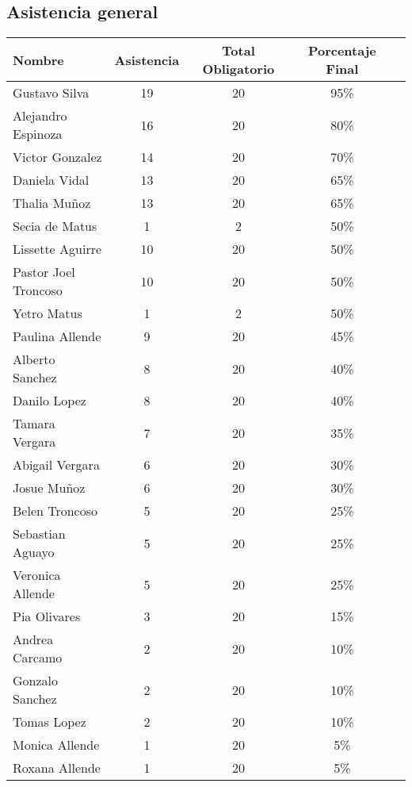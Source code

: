 \documentclass[12pt,letterpaper]{article}
\begin{document}
\subsection{Asistencia general}
\begin{table}[!h]
\centering
\begin{tabular}{|l|c|c|c|c|}
\hline
\textbf{Nombre} & \textbf{Asistencia} & \textbf{Total Obligatorio} & \textbf{Porcentaje Final} \\ \hline \hline
Gustavo Silva  & 19 & 20 & 95\% \\ \hline
Alejandro Espinoza & 16 & 20 & 80\% \\ \hline
Victor Gonzalez & 14 & 20 & 70\% \\ \hline
Daniela Vidal & 13 & 20 & 65\% \\ \hline
Thalia Muñoz  & 13 & 20 & 65\% \\ \hline
Secia de Matus & 1 & 2 & 50\% \\ \hline
Lissette Aguirre & 10 & 20 & 50\% \\ \hline
Pastor Joel Troncoso & 10 & 20 & 50\% \\ \hline
Yetro Matus & 1 & 2 &50\% \\ \hline
Paulina Allende & 9 & 20 & 45\% \\ \hline
Alberto Sanchez & 8 & 20 & 40\% \\ \hline
Danilo Lopez  & 8 & 20 & 40\% \\ \hline
Tamara Vergara & 7 & 20 & 35\% \\ \hline
Abigail Vergara  & 6 & 20 & 30\% \\ \hline
Josue Muñoz & 6 & 20 & 30\% \\ \hline
Belen Troncoso & 5 & 20 & 25\% \\ \hline
Sebastian Aguayo & 5 & 20 & 25\% \\ \hline
Veronica Allende & 5 & 20 & 25\% \\ \hline
Pia Olivares & 3 & 20 & 15\% \\ \hline
Andrea Carcamo & 2 & 20 & 10\% \\ \hline
Gonzalo Sanchez & 2 & 20 & 10\% \\ \hline
Tomas Lopez & 2 & 20 & 10\% \\ \hline
Monica Allende & 1 & 20 & 5\% \\ \hline
Roxana Allende & 1 & 20 & 5\% \\ \hline
\end{tabular}
\end{table}
\end{document}
